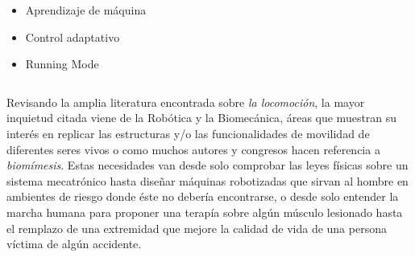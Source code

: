 {\begin{frame}
\begin{columns}[T]
\begin{column}{3.5cm}
{\begin{center}
            \begin{itemize}\scriptsize
            \item Aprendizaje de m\'aquina
            \item Control adaptativo
            \item Running Mode
            \end{itemize}
          \end{center}
        }
      \end{column}
    \end{columns}
  \end{frame}
}
Revisando la amplia literatura encontrada sobre \emph{la locomoci\'on}, la mayor inquietud citada viene de la Rob\'otica\cite{Xiang2010,Mattar2013} y la Biomec\'anica\cite{Xiang2010,Mattar2013}, \'areas que muestran su interés en replicar las estructuras y/o las funcionalidades de movilidad de diferentes seres vivos\cite{Xu2013,Chiang2013} o como muchos autores\cite{Xu2013} y congresos\cite{RB2009} hacen referencia a \emph{biom\'imesis}. Estas necesidades van desde solo comprobar las leyes f\'isicas sobre un sistema mecatr\'onico\cite{Barker2010,Lens2011} hasta dise\~nar m\'aquinas robotizadas que sirvan al hombre en ambientes de riesgo donde \'este no deber\'ia encontrarse\cite{Seifried2014,Wu2013a}, o desde solo entender la marcha humana para proponer una terap\'ia sobre alg\'un m\'usculo lesionado\cite{Kang2013} hasta el remplazo de una extremidad que mejore la calidad de vida de una persona v\'ictima de alg\'un accidente\cite{Roa2006,Wu2013a}.\par
